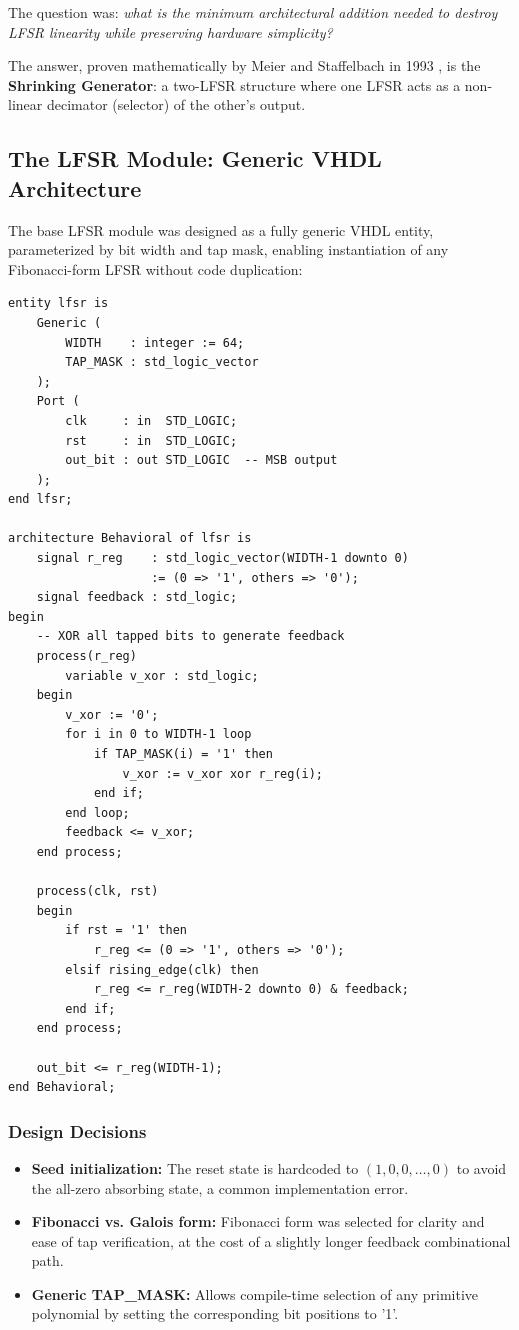 \documentclass[conference, a4paper]{IEEEtran}
\begin{document}
The question was: \textit{what is the minimum architectural addition needed to destroy LFSR linearity while preserving hardware simplicity?}

The answer, proven mathematically by Meier and Staffelbach in 1993 \cite{b1}, is the \textbf{Shrinking Generator}: a two-LFSR structure where one LFSR acts as a non-linear decimator (selector) of the other's output.

\subsection{The LFSR Module: Generic VHDL Architecture}

The base LFSR module was designed as a fully generic VHDL entity, parameterized by bit width and tap mask, enabling instantiation of any Fibonacci-form LFSR without code duplication:

\begin{lstlisting}[style=vhdlstyle, caption={Generic LFSR Entity — Parameterized Primitive Polynomial Engine}, label={lst:lfsr}]
entity lfsr is
    Generic (
        WIDTH    : integer := 64;
        TAP_MASK : std_logic_vector
    );
    Port (
        clk     : in  STD_LOGIC;
        rst     : in  STD_LOGIC;
        out_bit : out STD_LOGIC  -- MSB output
    );
end lfsr;

architecture Behavioral of lfsr is
    signal r_reg    : std_logic_vector(WIDTH-1 downto 0)
                    := (0 => '1', others => '0');
    signal feedback : std_logic;
begin
    -- XOR all tapped bits to generate feedback
    process(r_reg)
        variable v_xor : std_logic;
    begin
        v_xor := '0';
        for i in 0 to WIDTH-1 loop
            if TAP_MASK(i) = '1' then
                v_xor := v_xor xor r_reg(i);
            end if;
        end loop;
        feedback <= v_xor;
    end process;

    process(clk, rst)
    begin
        if rst = '1' then
            r_reg <= (0 => '1', others => '0');
        elsif rising_edge(clk) then
            r_reg <= r_reg(WIDTH-2 downto 0) & feedback;
        end if;
    end process;

    out_bit <= r_reg(WIDTH-1);
end Behavioral;
\end{lstlisting}

\subsubsection*{Design Decisions}
\begin{itemize}
    \item \textbf{Seed initialization:} The reset state is hardcoded to $(1, 0, 0, \ldots, 0)$ to avoid the all-zero absorbing state, a common implementation error.
    \item \textbf{Fibonacci vs. Galois form:} Fibonacci form was selected for clarity and ease of tap verification, at the cost of a slightly longer feedback combinational path.
    \item \textbf{Generic TAP\_MASK:} Allows compile-time selection of any primitive polynomial by setting the corresponding bit positions to '1'.
\end{itemize}
\end{document}
